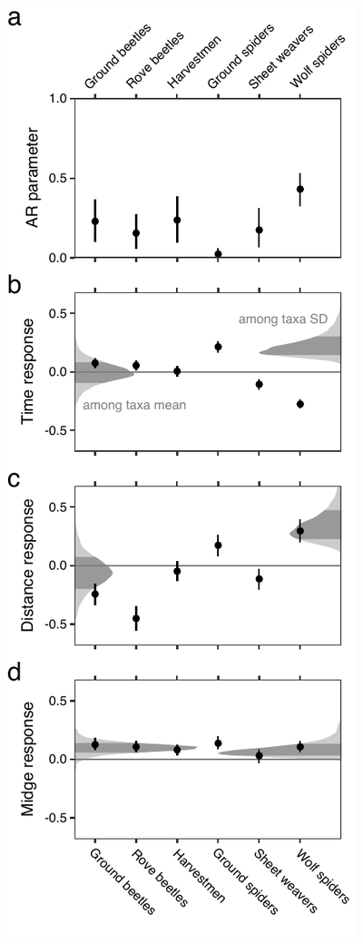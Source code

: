 \documentclass[12pt]{article}
\begin{document}
\begin{figure}
\begin{minipage}[c]{3.5in}
\includegraphics{fig2.pdf}
\end{minipage}\hfill
\begin{minipage}[b]{3in}

\end{minipage}
\end{figure}
\end{document}
